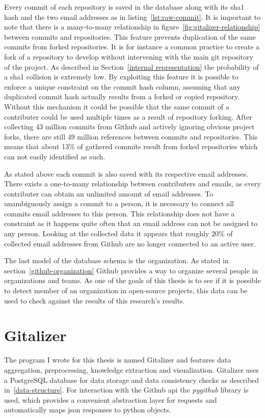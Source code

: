 Every commit of each repository is saved in the database along with its \ac{sha1} hash and the two email addresses as in listing~\ref{lst:raw-commit}.
It is important to note that there is a many-to-many relationship in figure~\ref{fig:gitalizer-relationship} between commits and repositories.
This feature prevents duplication of the same commits from forked repositories.
It is for instance a common practice to create a fork of a repository to develop without intervening with the main git repository of the project.
As described in Section~\ref{internal representation} the probability of a \ac{sha1} collision is extremely low.
By exploiting this feature it is possible to enforce a unique constraint on the commit hash column, assuming that any duplicated commit hash actually results from a forked or copied repository.
Without this mechanism it could be possible that the same commit of a contributer could be used multiple times as a result of repository forking.
After collecting 43 million commits from Github and actively ignoring obvious project forks, there are still 49 million references between commits and repositories.
This means that about 13\% of gathered commits result from forked repositories which can not easily identified as such.

As stated above each commit is also saved with its respective email addresses.
There exists a one-to-many relationship between contributers and emails, as every contributer can obtain an unlimited amount of email addresses.
To unambiguously assign a commit to a person, it is necessary to connect all commits email addresses to this person.
This relationship does not have a  constraint as it happens quite often that an email address can not be assigned to any person.
Looking at the collected data it appears that roughly 20\% of collected email addresses from Github are no longer connected to an active user.

The last model of the database schema is the organization.
As stated in section~\ref{github-organization} Github provides a way to organize several people in organizations and teams.
As one of the goals of this thesis is to see if it is possible to detect member of an organization in open-source projects, this data can be used to check against the results of this research's results.


\section{Gitalizer}
The program I wrote for this thesis is named Gitalizer and features data aggregation, preprocessing, knowledge extraction and visualization.
Gitalizer uses a PostgreSQL database for data storage and data consistency checks as described in~\ref{data-structure}.
For interaction with the Github \ac{api} the \emph{pygithub} library is used, which provides a convenient abstraction layer for requests and automatically maps \ac{json} responses to python objects.


